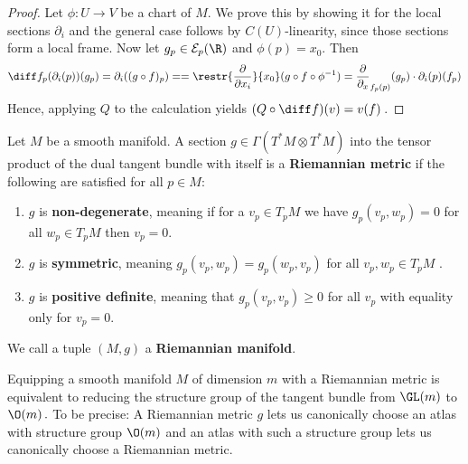 		\begin{proof}Let $\phi:U \to V$ be a chart of $M$. 
			We prove this by showing it for the local sections $\partial_i$ and the general case follows by $C(U)$-linearity, since those sections form a local frame. Now let $g_p\in \mathcal{E}_p(\R)$ and $\phi(p)=x_0$. Then
		\begin{equation*}
		\diff f _p(\partial_i(p))(g_p)= 
		\partial_i((g\circ f)_p)=
		=\restr{\frac{\partial }{\partial x_i}}{x_0}(g\circ f\circ \phi^{-1})
		=\frac{\partial}{\partial_x}_{f_p(p)}(g_p) \cdot  \partial_i(p)(f_p)
		\end{equation*}
		Hence, applying $Q$ to the calculation yields $(Q\circ \diff f)(v)=v(f)$\,.
	\end{proof}
	
	
\begin{definition}[A Metric]
	Let $M$ be a smooth manifold.
	A section $g\in \Gamma(T^*M\otimes T^*M)$ into the tensor product of the dual tangent bundle with itself is a \textbf{Riemannian metric} if the following are satisfied for all $p\in M$:
	\begin{enumerate}
		\item $g$ is \textbf{non-degenerate}, meaning if for a $v_p\in T_pM$ we have $g_p(v_p,w_p)=0$ for all $w_p\in T_pM$ then $v_p=0$.
		\item $g$ is \textbf{symmetric}, meaning $g_p(v_p,w_p)=g_p(w_p,v_p)$ for all $ v_p,w_p\in T_pM$ .
		\item $g$ is \textbf{positive definite}, meaning that $g_p(v_p,v_p)\geq 0 $ for all $v_p$ with equality only for $v_p=0$.
	\end{enumerate} We call a tuple $(M,g)$ a \textbf{Riemannian manifold}.
\end{definition}
\begin{remark}
	Equipping a smooth manifold $M$ of dimension $m$ with a Riemannian metric is equivalent to reducing the structure group of the tangent bundle from $\GL(m)$ to $\O(m)\,.$
	To be precise: A Riemannian metric $g$ lets us canonically choose an atlas with structure group $\O(m)$ and an atlas with such a structure group lets us canonically choose a Riemannian metric. 
\end{remark}
